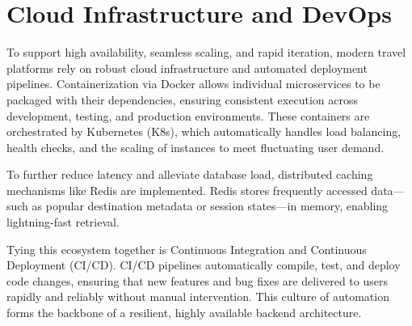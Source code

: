 \section{Cloud Infrastructure and DevOps}
To support high availability, seamless scaling, and rapid iteration, modern travel platforms rely on robust cloud infrastructure and automated deployment pipelines. Containerization via Docker allows individual microservices to be packaged with their dependencies, ensuring consistent execution across development, testing, and production environments. These containers are orchestrated by Kubernetes (K8s), which automatically handles load balancing, health checks, and the scaling of instances to meet fluctuating user demand.

To further reduce latency and alleviate database load, distributed caching mechanisms like Redis are implemented. Redis stores frequently accessed data—such as popular destination metadata or session states—in memory, enabling lightning-fast retrieval. 

Tying this ecosystem together is Continuous Integration and Continuous Deployment (CI/CD). CI/CD pipelines automatically compile, test, and deploy code changes, ensuring that new features and bug fixes are delivered to users rapidly and reliably without manual intervention. This culture of automation forms the backbone of a resilient, highly available backend architecture.
